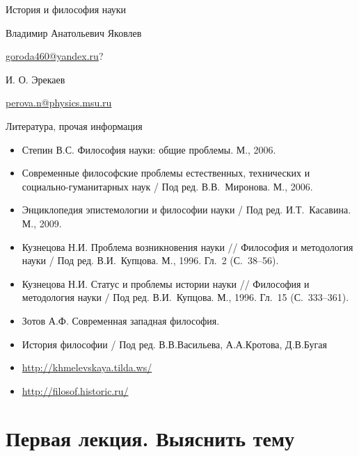 \documentclass[a4paper, 12pt]{article}
\begin{document}
\thispagestyle{empty}

\null\vfill

\begin{center}
  \begin{Large}
    История и философия науки
  \end{Large}

  Владимир Анатольевич Яковлев

  \href{mailto:goroda460@yandex.ru}{goroda460@yandex.ru}?

  И. О. Эрекаев

  \href{mailto:perova.n@physics.msu.ru}{perova.n@physics.msu.ru}
\end{center}

\vfill

Литература, прочая информация
\begin{itemize}
  \item Степин В.С. Философия науки: общие проблемы. М., 2006.
  \item Современные философские проблемы естественных, технических 
    и социально-гуманитарных наук / Под ред. В.В.~Миронова. М., 2006.
  \item Энциклопедия эпистемологии и философии науки / Под ред. 
    И.Т.~Касавина. М., 2009.
  \item Кузнецова Н.И. Проблема возникновения науки // Философия 
    и методология науки / Под ред. В.И.~Купцова. М., 1996. Гл.~2 
    (С.~38--56).
  \item Кузнецова Н.И. Статус и проблемы истории науки // Философия 
    и методология науки / Под ред. В.И.~Купцова. М., 1996. Гл.~15 
    (С.~333--361).
\end{itemize}
\hrulefill
\begin{itemize}
  \item Зотов А.Ф. Современная западная философия.
  \item История философии / Под ред. В.В.Васильева, А.А.Кротова, Д.В.Бугая
  \item \url{http://khmelevskaya.tilda.ws/}
  \item \url{http://filosof.historic.ru/}
\end{itemize}

\clearpage
\tableofcontents
\clearpage

\section{Первая лекция. Выяснить тему}
\end{document}
